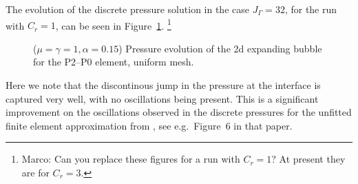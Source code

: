 \documentclass[a4paper,12pt,onecolumn]{article}
\begin{document}
The evolution of the discrete pressure solution in the case $J_\Gamma = 32$,
for the run with $C_r = 1$, can be seen in 
Figure~\ref{fig:expanding_bubble_uniform}.
\footnote{Marco: Can you replace these figures for a run with $C_r = 1$? At
present they are for $C_r=3$.}
\begin{figure}[htbp]
  \centering
  \caption{($\mu=\gamma=1,\alpha = 0.15$) Pressure evolution of the 2d expanding bubble for the P2--P0 element, uniform mesh.}
  \label{fig:expanding_bubble_uniform}
\end{figure}
Here we note that the discontinous jump in the pressure at the interface is
captured very well, with no oscillations being present. This is a significant
improvement on the oscillations observed in the discrete pressures for the 
unfitted finite element approximation from \cite{spurious}, see e.g.\
Figure~6 in that paper.
\end{document}
